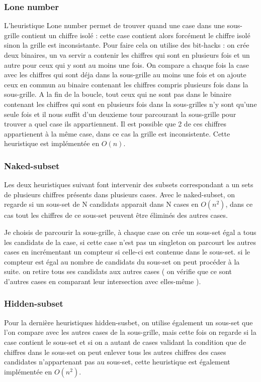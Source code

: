 \documentclass[11pt,a4paper]{article}
\begin{document}
\subsubsection{Lone number}
\hspace{10} 
L'heuristique Lone number permet de trouver quand une case dans une sous-grille contient un chiffre isolé : cette case contient alors forcément le chiffre isolé sinon la grille est inconsistante. Pour faire cela on utilise des bit-hacks : on crée deux binaires, un va servir a contenir les chiffres qui sont en plusieurs fois et un autre pour ceux qui y sont au moins une fois. On compare a chaque fois la case avec les chiffres qui sont déja dans la sous-grille au moins une fois et on ajoute ceux en commun au binaire contenant les chiffres compris plusieurs fois dans la sous-grille. A la fin de la boucle, tout ceux qui ne sont pas dans le binaire contenant les chiffres qui sont en plusieurs fois dans la sous-grilles n'y sont qu'une seule fois et il nous suffit d'un deuxieme tour parcourant la sous-grille pour trouver a quel case ils appartiennent. Il est possible que 2 de ces chiffres appartienent à la même case, dans ce cas la grille est inconsistente. Cette heuristique est implémentée en $O(n)$.

\subsubsection{Naked-subset}
\hspace{10} 
Les deux heuristiques suivant font intervenir des subsets correspondant a un sets de plusieurs chiffres présents dans plusieurs cases. Avec le naked-subset, on regarde si un sous-set de N candidats apparait dans N cases en $O(n^2)$, dans ce cas tout les chiffres de ce sous-set peuvent être éliminés des autres cases. 

\hspace{10}
Je choisis de parcourir la sous-grille, à chaque case on crée un sous-set égal a tous les candidats de la case, si cette case n'est pas un singleton on parcourt les autres cases en incrémentant un compteur si celle-ci est contenue dans le sous-set. si le compteur est égal au nombre de candidats du sous-set on peut procéder à la suite. on retire tous ses candidats aux autres cases ( on vérifie que ce sont d'autres cases en comparant leur intersection avec elles-même ).

\subsubsection{Hidden-subset}
\hspace{10} 
Pour la dernière heuristiques hidden-susbet, on utilise également un sous-set que l'on compare avec les autres cases de la sous-grille, mais cette fois on regarde si la case contient le sous-set et si on a autant de cases validant la condition que de chiffres dans le sous-set on peut enlever tous les autres chiffres des cases candidates n'appartenant pas au sous-set, cette heuristique est également implémentée en $O(n^2)$.
\end{document}
